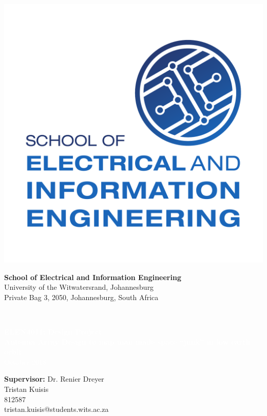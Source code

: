 \documentclass[11pt]{witseiepaper}
\begin{document}
	
\thispagestyle{empty}
\pagestyle{plain}
\onecolumn
\begin{minipage}{0.16\textwidth}
    \includegraphics[width=\textwidth,height=\textwidth]{logo.pdf}
\end{minipage}
\begin{minipage}{0.8\textwidth}
    \centering
    \textbf{\Large School of Electrical and Information Engineering}\\
    {\large University of the Witwatersrand, Johannesburg}\\
    {\small Private Bag 3, 2050, Johannesburg, South Africa}\\
\end{minipage}
\vspace{.3cm}\\
\colorbox{myblue}{\begin{minipage}{0.98\textwidth}
        \begin{center}
        	\centering
            \textcolor{white}{\textbf{\Large{ELEN4011: Design Project}}\\
                \textbf{Antenna Array Design to map man made space “junk” in low earth orbit}\\
                October 2018
            }
        \end{center}
    \end{minipage}
}
\vspace{3cm}
\begin{center}
\textbf{Supervisor:} Dr. Renier Dreyer\\

\vspace{2cm}
{\Large Tristan Kuisis} \\
{\small 812587} \\
{\small tristan.kuisis@students.wits.ac.za}
\end{center}
\end{document}
